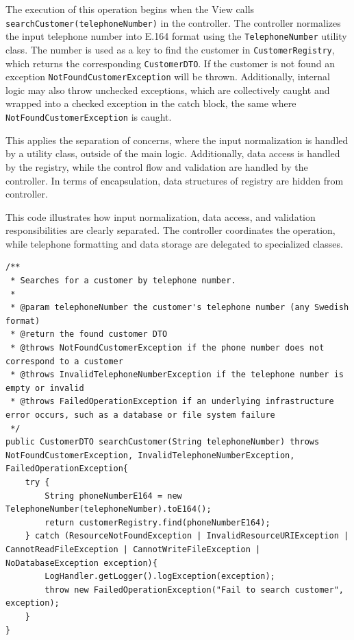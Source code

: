 \documentclass[a4paper]{scrartcl}
\begin{document}
The execution of this operation begins when the View calls \texttt{searchCustomer(telephoneNumber)} in the controller. The controller normalizes the input telephone number into E.164 format using the \texttt{TelephoneNumber} utility class. The number is used as a key to find the customer in \texttt{CustomerRegistry}, which returns the corresponding \texttt{CustomerDTO}. If the customer is not found an exception \texttt{NotFoundCustomerException} will be thrown. Additionally, internal logic may also throw unchecked exceptions, which are collectively caught and wrapped into a checked exception in the catch block, the same where \texttt{NotFoundCustomerException} is caught.

This applies the separation of concerns, where the input normalization is handled by a utility class, outside of the main logic. Additionally, data access is handled by the registry, while the control flow and validation are handled by the controller. In terms of encapsulation, data structures of registry are hidden from controller. 

This code illustrates how input normalization, data access, and validation responsibilities are clearly separated. The controller coordinates the operation, while telephone formatting and data storage are delegated to specialized classes.

\begin{lstlisting}[style=javastyle, caption={Searching a customer using \texttt{searchCustomer} method in \texttt{ReceptionistController}}]
/**
 * Searches for a customer by telephone number.
 *
 * @param telephoneNumber the customer's telephone number (any Swedish format)
 * @return the found customer DTO
 * @throws NotFoundCustomerException if the phone number does not correspond to a customer
 * @throws InvalidTelephoneNumberException if the telephone number is empty or invalid
 * @throws FailedOperationException if an underlying infrastructure error occurs, such as a database or file system failure
 */
public CustomerDTO searchCustomer(String telephoneNumber) throws NotFoundCustomerException, InvalidTelephoneNumberException, FailedOperationException{
    try {
        String phoneNumberE164 = new TelephoneNumber(telephoneNumber).toE164();
        return customerRegistry.find(phoneNumberE164);
    } catch (ResourceNotFoundException | InvalidResourceURIException | CannotReadFileException | CannotWriteFileException | NoDatabaseException exception){
        LogHandler.getLogger().logException(exception);
        throw new FailedOperationException("Fail to search customer", exception);
    }
}
\end{lstlisting}
\end{document}

